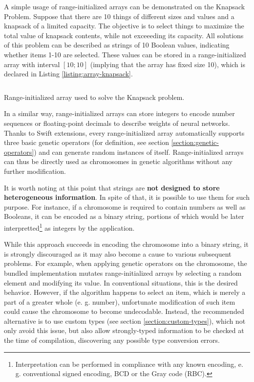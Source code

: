 A simple usage of range-initialized arrays can be demonstrated on the Knapsack Problem. Suppose that there are 10 things of different sizes and values and a knapsack of a limited capacity. The objective is to select things to maximize the total value of knapsack contents, while not exceeeding its capacity. All solutions of this problem can be described as strings of 10 Boolean values, indicating whether items 1-10 are selected. These values can be stored in a range-initialized array with interval $[10;10]$ (implying that the array has fixed size 10), which is declared in Listing \ref{listing:array-knapsack}.

\begin{listing}[ht]
	\inputminted{swift}{../code/array-knapsack.swift}
	\caption{Range-initialized array used to solve the Knapsack problem.}
	\label{listing:array-knapsack}
\end{listing}

In a similar way, range-initialized arrays can store integers to encode number sequences or floating-point decimals to describe weights of neural networks. Thanks to Swift extensions, every range-initialized array automatically supports three basic genetic operators (for definition, see section \ref{section:genetic-operators}) and can generate random instances of itself. Range-initialized arrays can thus be directly used as chromosomes in genetic algorithms without any further modification.

It is worth noting at this point that strings are \textbf{not designed to store heterogeneous information}. In spite of that, it is possible to use them for such purpose. For instance, if a chromosome is required to contain numbers as well as Booleans, it can be encoded as a binary string, portions of which would be later interpretted\footnote{Interpretation can be performed in compliance with any known encoding, e. g. conventional signed encoding, BCD or the Gray code (RBC).} as integers by the application.

While this approach succeeds in encoding the chromosome into a binary string, it is strongly discouraged as it may also become a cause to various subsequent problems. For example, when applying genetic operators on the chromosome, the bundled implementation mutates range-initialized arrays by selecting a random element and modifying its value. In conventional situations, this is the desired behavior. However, if the algorithm happens to select an item, which is merely a part of a greater whole (e. g. number), unfortunate modification of such item could cause the chromosome to become undecodable. Instead, the recommended alternative is to use custom types (see section \ref{section:custom-types}), which not only avoid this issue, but also allow strongly-typed information to be checked at the time of compilation, discovering any possible type conversion errors.


